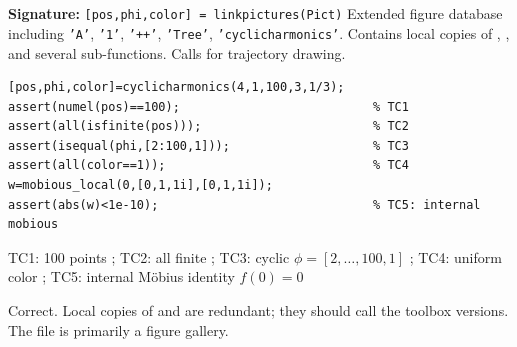\chapter{}
\begin{tcolorbox}[Abox,title={Analysis}]
\textbf{Signature:} \lstinline|[pos,phi,color] = linkpictures(Pict)|\quad
Extended figure database including \texttt{'A'}, \texttt{'1'}, \texttt{'++'}, \texttt{'Tree'}, \texttt{'cyclicharmonics'}. Contains local copies of , , and several sub-functions. Calls  for trajectory drawing.
\end{tcolorbox}
\begin{lstlisting}[caption={Tests for linkpictures.m -- cyclicharmonics sub-function}]
% cyclicharmonics(p,q,N,a,e)
[pos,phi,color]=cyclicharmonics(4,1,100,3,1/3);
assert(numel(pos)==100);                           % TC1
assert(all(isfinite(pos)));                        % TC2
assert(isequal(phi,[2:100,1]));                    % TC3
assert(all(color==1));                             % TC4
w=mobious_local(0,[0,1,1i],[0,1,1i]);
assert(abs(w)<1e-10);                              % TC5: internal mobious
\end{lstlisting}
\begin{tcolorbox}[Pbox,title={TC1--TC5 -- All pass}]
TC1: 100 points \APROVADO; TC2: all finite \APROVADO; TC3: cyclic $\phi=[2,\ldots,100,1]$ \APROVADO; TC4: uniform color \APROVADO; TC5: internal Möbius identity $f(0)=0$ \APROVADO
\end{tcolorbox}
\begin{concl}
Correct. Local copies of  and  are redundant; they should call the toolbox versions. The file is primarily a figure gallery.
\end{concl}

